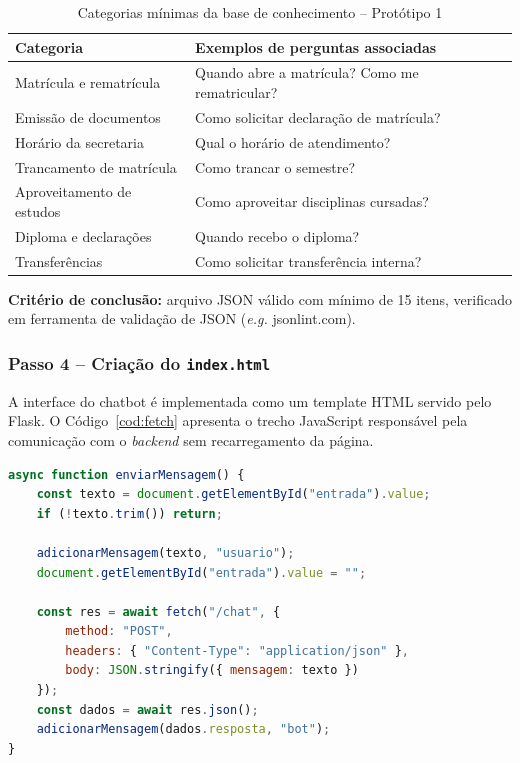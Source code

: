 \begin{table}[htbp]
\centering
\caption{Categorias mínimas da base de conhecimento -- Protótipo 1}
\label{tab:categorias}
\begin{tabular}{|l|l|}
\hline
\textbf{Categoria} & \textbf{Exemplos de perguntas associadas} \\
\hline
Matrícula e rematrícula & Quando abre a matrícula? Como me rematricular? \\
Emissão de documentos & Como solicitar declaração de matrícula? \\
Horário da secretaria & Qual o horário de atendimento? \\
Trancamento de matrícula & Como trancar o semestre? \\
Aproveitamento de estudos & Como aproveitar disciplinas cursadas? \\
Diploma e declarações & Quando recebo o diploma? \\
Transferências & Como solicitar transferência interna? \\
\hline
\end{tabular}
\end{table}

\textbf{Critério de conclusão:} arquivo JSON válido com mínimo de 15 itens, verificado em ferramenta de validação de JSON (\textit{e.g.} jsonlint.com).

\subsubsection{Passo 4 -- Criação do \texttt{index.html}}

A interface do chatbot é implementada como um template HTML servido pelo Flask. O Código~\ref{cod:fetch} apresenta o trecho JavaScript responsável pela comunicação com o \textit{backend} sem recarregamento da página.

\begin{lstlisting}[language=JavaScript, caption={Função de envio de mensagem via fetch -- index.html}, label={cod:fetch}]
async function enviarMensagem() {
    const texto = document.getElementById("entrada").value;
    if (!texto.trim()) return;

    adicionarMensagem(texto, "usuario");
    document.getElementById("entrada").value = "";

    const res = await fetch("/chat", {
        method: "POST",
        headers: { "Content-Type": "application/json" },
        body: JSON.stringify({ mensagem: texto })
    });
    const dados = await res.json();
    adicionarMensagem(dados.resposta, "bot");
}
\end{lstlisting}

